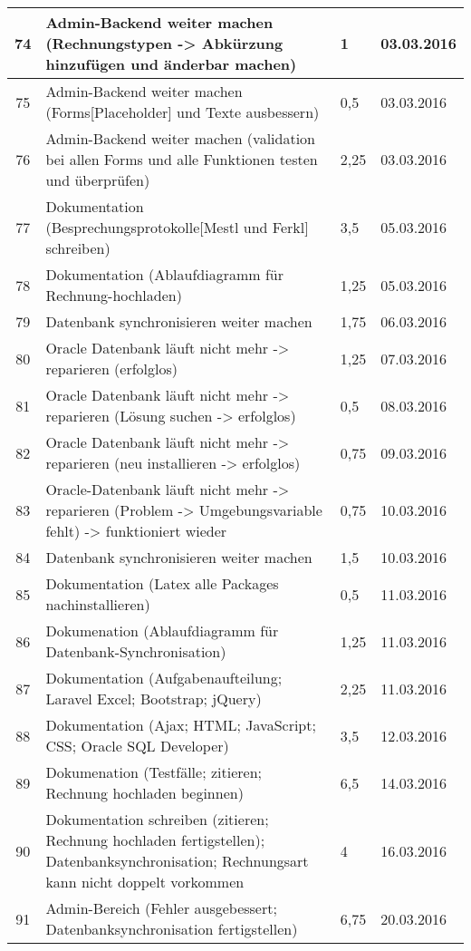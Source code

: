 \begin{longtable}[h]{| c | p{11.6cm} | l | l |}
74 & Admin-Backend weiter machen (Rechnungstypen -> Abkürzung hinzufügen und änderbar machen) & 1 & 03.03.2016 \\ \hline
75 & Admin-Backend weiter machen (Forms[Placeholder] und Texte ausbessern) & 0,5 & 03.03.2016 \\ \hline
76 & Admin-Backend weiter machen (validation bei allen Forms und alle Funktionen testen und überprüfen) & 2,25 & 03.03.2016 \\ \hline
77 & Dokumentation (Besprechungsprotokolle[Mestl und Ferkl] schreiben) & 3,5 & 05.03.2016 \\ \hline
78 & Dokumentation (Ablaufdiagramm für Rechnung-hochladen) & 1,25 &05.03.2016 \\ \hline
79 & Datenbank synchronisieren weiter machen & 1,75 & 06.03.2016 \\ \hline
80 & Oracle Datenbank läuft nicht mehr -> reparieren (erfolglos) & 1,25 & 07.03.2016 \\ \hline
81 & Oracle Datenbank läuft nicht mehr -> reparieren (Lösung suchen -> erfolglos) & 0,5 & 08.03.2016 \\ \hline
82 & Oracle Datenbank läuft nicht mehr -> reparieren (neu installieren -> erfolglos) & 0,75 & 09.03.2016 \\ \hline
83 & Oracle-Datenbank läuft nicht mehr -> reparieren (Problem -> Umgebungsvariable fehlt) -> funktioniert wieder & 0,75 & 10.03.2016 \\ \hline
84 & Datenbank synchronisieren weiter machen & 1,5 & 10.03.2016 \\ \hline
85 & Dokumentation (Latex alle Packages nachinstallieren) & 0,5 & 11.03.2016 \\ \hline
86 & Dokumenation (Ablaufdiagramm für Datenbank-Synchronisation) & 1,25 & 11.03.2016 \\ \hline
87 & Dokumentation (Aufgabenaufteilung; Laravel Excel; Bootstrap; jQuery) & 2,25 & 11.03.2016 \\ \hline
88 & Dokumentation (Ajax; HTML; JavaScript; CSS; Oracle SQL Developer) & 3,5 & 12.03.2016 \\ \hline
89 & Dokumenation (Testfälle; zitieren; Rechnung hochladen beginnen) & 6,5 & 14.03.2016 \\ \hline
90 & Dokumentation schreiben (zitieren; Rechnung hochladen fertigstellen); Datenbanksynchronisation; Rechnungsart kann nicht doppelt vorkommen & 4 & 16.03.2016 \\ \hline
91 & Admin-Bereich (Fehler ausgebessert; Datenbanksynchronisation fertigstellen) & 6,75 & 20.03.2016 \\ \hline

\end{longtable}
